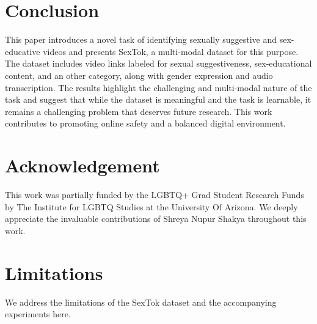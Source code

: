 \documentclass[11pt]{article}
\begin{document}
\section{Conclusion}

This paper introduces a novel task of identifying sexually suggestive and sex-educative videos and presents SexTok, a multi-modal dataset for this purpose. The dataset includes video links labeled for sexual suggestiveness, sex-educational content, and an other category, along with gender expression and audio transcription. The results highlight the challenging and multi-modal nature of the task and suggest that while the dataset is meaningful and the task is learnable,  it remains a challenging problem that deserves future research. This work contributes to promoting online safety and a balanced digital environment.

\section{Acknowledgement}

This work was partially funded by the LGBTQ+ Grad Student Research Funds by The Institute for LGBTQ Studies at the University Of Arizona. We deeply appreciate the invaluable contributions of Shreya Nupur Shakya throughout this work.

\section*{Limitations}
We address the limitations of the SexTok dataset and the accompanying experiments here.
\end{document}
